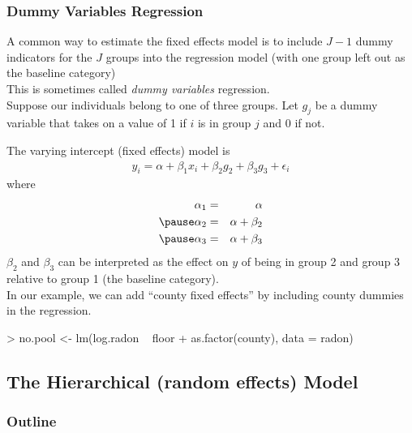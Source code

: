 \documentclass[handout]{beamer}
\begin{document}
\begin{frame}
\frametitle{Dummy Variables Regression}
A common way to estimate the fixed effects model is to
include $J-1$ dummy indicators for the $J$ groups into the regression model (with one group left out as the baseline category)\\ 
\pause
\bigskip
This is sometimes called \textit{dummy variables} regression.\\
\pause
\bigskip
Suppose our individuals belong to one of three groups.  \pause  Let
$g_j$ be a dummy variable that takes on a value of 1 if $i$ is in
group $j$ and 0 if not.
\end{frame}

\begin{frame}[fragile]
The varying intercept (fixed effects) model is
\begin{eqnarray*}
y_i = \alpha + \beta_1 x_i + \beta_2 g_2 + \beta_3 g_3 + \epsilon_i
\end{eqnarray*}
\pause
where 
\begin{eqnarray*}
\alpha_1 &=& \alpha \\
\pause
\alpha_2 &=& \alpha + \beta_2\\
\pause
\alpha_3 &=& \alpha + \beta_3\\ 
\end{eqnarray*}
\pause
$\beta_2$ and $\beta_3$ can be interpreted as the effect on $y$ of being in
group 2 and group 3 relative to group 1 (the baseline category).\\
\pause
\bigskip
In our example, we can add ``county fixed effects'' by including
county dummies in the regression.
\tiny
\medskip
\pause
\begin{Schunk}
\begin{Sinput}
> no.pool <- lm(log.radon ~ floor + as.factor(county), data = radon)
\end{Sinput}
\end{Schunk}
\normalsize
\end{frame}

\begin{frame}


\end{frame}

\subsection{The Hierarchical (random effects) Model}

\begin{frame}
\frametitle{Outline}
\tableofcontents[currentsubsection]
\end{frame}
\end{document}
